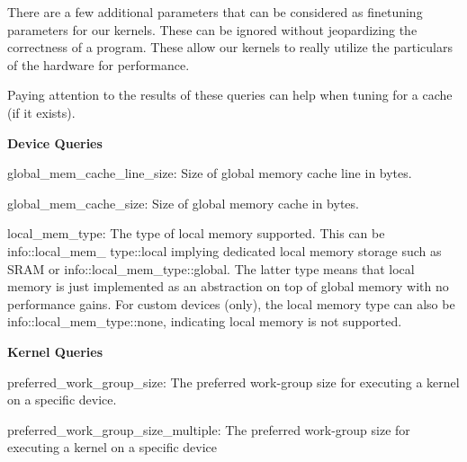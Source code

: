 There are a few additional parameters that can be considered as finetuning parameters for our kernels. These can be ignored without jeopardizing the correctness of a program. These allow our kernels to really utilize the particulars of the hardware for performance.\par

\begin{tcolorbox}[colback=red!5!white,colframe=red!75!black]
Paying attention to the results of these queries can help when tuning for a cache (if it exists).
\end{tcolorbox}

\hspace*{\fill} \par %
\textbf{Device Queries}

global\_mem\_cache\_line\_size: Size of global memory cache line in bytes.\par

global\_mem\_cache\_size: Size of global memory cache in bytes.\par

local\_mem\_type: The type of local memory supported. This can be info::local\_mem\_
type::local implying dedicated local memory storage such as SRAM or info::local\_mem\_type::global. The latter type means that local memory is just implemented as an abstraction on top of global memory with no performance gains. For custom devices (only), the local memory type can also be info::local\_mem\_type::none, indicating local memory is not supported.\par

\hspace*{\fill} \par %
\textbf{Kernel Queries}

preferred\_work\_group\_size: The preferred work-group size for executing a kernel on a specific device.\par

preferred\_work\_group\_size\_multiple: The preferred work-group size for executing a kernel on a specific device\par
















































